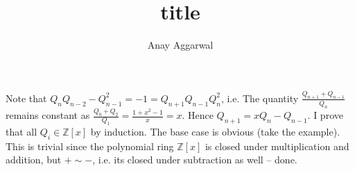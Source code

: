 \documentclass[11pt]{scrartcl}
\title{title}
\author{Anay Aggarwal}
\begin{document}
\maketitle
Note that $Q_nQ_{n-2}-Q_{n-1}^2=-1=Q_{n+1}Q_{n-1}Q_n^2$, i.e. The quantity $\frac{Q_{n+1}+Q_{n-1}}{Q_n}$ remains constant as $\frac{Q_0+Q_2}{Q_1}=\frac{1+x^2-1}{x}=x$.  Hence $Q_{n+1}=xQ_n-Q_{n-1}$. I prove that all $Q_i\in \mathbb{Z}[x]$ by induction. The base case is obvious (take the example). This is trivial since the polynomial ring $\mathbb{Z}[x]$ is closed under multiplication and addition, but $+\sim -$, i.e. its closed under subtraction as well -- done.
\end{document}
